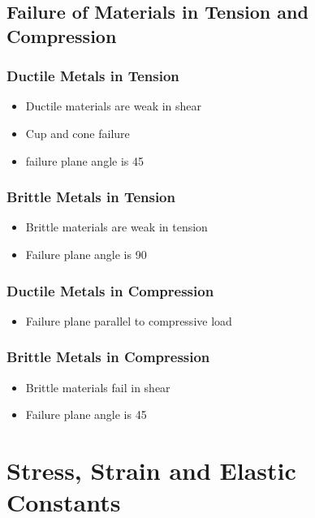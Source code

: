 \documentclass[8pt]{report}
\begin{document}
\section{Failure of Materials in Tension and Compression}
	\subsection{Ductile Metals in Tension}
		\begin{itemize}
			\item Ductile materials are weak in shear
			\item Cup and cone failure
			\item failure plane angle is 45\textdegree
		\end{itemize}\hrulefill
	\subsection{Brittle Metals in Tension}
		\begin{itemize}
			\item Brittle materials are weak in tension
			\item Failure plane angle is 90\textdegree
		\end{itemize}\hrulefill
	\subsection{Ductile Metals in Compression}
		\begin{itemize}
			\item Failure plane parallel to compressive load
		\end{itemize}\hrulefill
	\subsection{Brittle Metals in Compression}
		\begin{itemize}
			\item Brittle materials fail in shear
			\item Failure plane angle is 45\textdegree
		\end{itemize}\hrulefill
\chapter{Stress, Strain and Elastic Constants}
\end{document}
